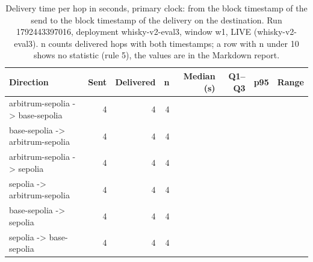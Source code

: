 \begin{table}[htbp]
    \centering
    \small
    \begin{tabular}{lrrrrrrr}
    \toprule
    Direction & Sent & Delivered & n & Median (s) & Q1--Q3 & p95 & Range \\
    \midrule
    arbitrum-sepolia -> base-sepolia & 4 & 4 & 4 &  &  &  &  \\
    base-sepolia -> arbitrum-sepolia & 4 & 4 & 4 &  &  &  &  \\
    arbitrum-sepolia -> sepolia & 4 & 4 & 4 &  &  &  &  \\
    sepolia -> arbitrum-sepolia & 4 & 4 & 4 &  &  &  &  \\
    base-sepolia -> sepolia & 4 & 4 & 4 &  &  &  &  \\
    sepolia -> base-sepolia & 4 & 4 & 4 &  &  &  &  \\
    \bottomrule
    \end{tabular}
    \caption{Delivery time per hop in seconds, primary clock: from the block timestamp of the send to the block timestamp of the delivery on the destination. Run 1792443397016, deployment whisky-v2-eval3, window w1, LIVE (whisky-v2-eval3). n counts delivered hops with both timestamps; a row with n under 10 shows no statistic (rule 5), the values are in the Markdown report.}
    \label{tab:delivery-latency-1792443397016}
\end{table}
